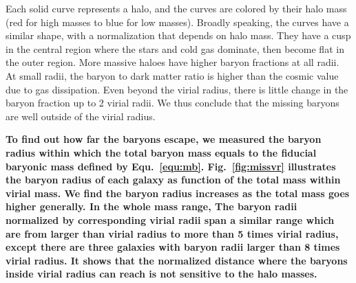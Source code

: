 \documentclass[useAMS,usenatbib]{mn2e}
\begin{document}
Each solid curve represents a halo, and the curves are colored by
their halo mass (red for high masses to blue for low masses).  Broadly
speaking, the curves have a similar shape, with a normalization that
depends on halo mass. They have a cusp in  the central region where the
stars and cold gas dominate, then become flat in the outer region.
More massive haloes have higher baryon fractions at all radii.  At
small radii, the baryon to dark matter ratio is higher than the cosmic
value due to gas dissipation.  Even beyond the virial radius, there is
little change in the baryon fraction up to 2 virial radii.  We thus
conclude that the missing baryons are well outside of the virial
radius.


{\bf To find out how far the baryons escape, we measured the baryon 
radius within which the total baryon mass equals to the fiducial
baryonic mass defined by Equ.~\ref{equ:mb}.
Fig.~\ref{fig:missvr} illustrates the baryon radius of each galaxy
as function of the total mass within virial mass.
We find the baryon radius increases as the total mass goes higher
generally.
In the whole mass range, The baryon radii normalized by 
corresponding virial radii span a similar range
which are from larger than virial radius to more than 5 times
virial radius, except there are three galaxies with baryon
radii larger than 8 times virial radius. 
It shows that the normalized distance where the baryons inside
virial radius can reach is not sensitive to the halo masses.}
\end{document}
